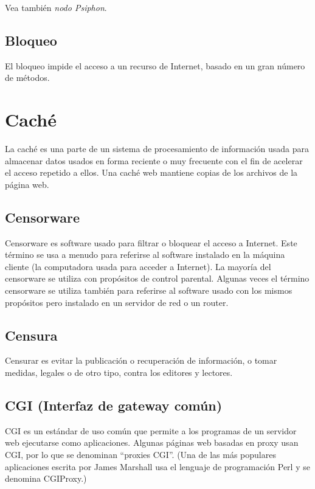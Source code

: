 Vea también \emph{nodo Psiphon}.

\subsection{Bloqueo}\label{bloqueo}

El bloqueo impide el acceso a un recurso de Internet, basado en un gran
número de métodos.

\section{Caché}\label{cachuxe9}

La caché es una parte de un sistema de procesamiento de información
usada para almacenar datos usados en forma reciente o muy frecuente con
el fin de acelerar el acceso repetido a ellos. Una caché web mantiene
copias de los archivos de la página web.

\subsection{Censorware}\label{censorware}

Censorware es software usado para filtrar o bloquear el acceso a
Internet. Este término se usa a menudo para referirse al software
instalado en la máquina cliente (la computadora usada para acceder a
Internet). La mayoría del censorware se utiliza con propósitos de
control parental. Algunas veces el término censorware se utiliza también
para referirse al software usado con los mismos propósitos pero
instalado en un servidor de red o un router.

\subsection{Censura}\label{censura}

Censurar es evitar la publicación o recuperación de información, o tomar
medidas, legales o de otro tipo, contra los editores y lectores.

\subsection{CGI (Interfaz de gateway
común)}\label{cgi-interfaz-de-gateway-comuxfan}

CGI es un estándar de uso común que permite a los programas de un
servidor web ejecutarse como aplicaciones. Algunas páginas web basadas
en proxy usan CGI, por lo que se denominan ``proxies CGI''. (Una de las
más populares aplicaciones escrita por James Marshall usa el lenguaje de
programación Perl y se denomina CGIProxy.)

